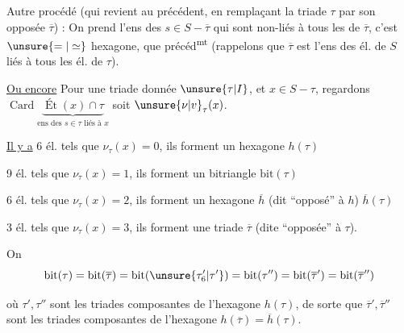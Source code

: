Autre procédé (qui revient au précédent, en remplaçant la triade $\tau$ par son opposée $\overline\tau$) : On prend l'ens des $s\in S-\overline\tau$ qui sont non-liés à tous les  de $\overline\tau$,  c'est   $\unsure{=|\simeq}$ hexagone,  que précéd\textsuperscript{mt} (rappelons que $\overline\tau$ est l'ens des él. de $S$ liés à tous les él. de $\tau$).

\uline{Ou encore} Pour une triade donnée $\unsure{\tau|I}$, et $x\in S-\tau$, regardons  $\operatorname{Card}\underbrace{\operatorname{Ét}(x)\cap\tau}_{\text{ens des }s\in\tau\text{ liés à }x}$ \unsure{,|]} soit $\unsure{\nu|v}_\tau(x)$.

\uline{Il y a} 6 él. tels que $\nu_\tau(x)=0$, ils forment un hexagone $h(\tau)$

9 él. tels que $\nu_\tau(x)=1$, ils forment un bitriangle $\mathrm{bit}(\tau)$

6 él. tels que $\nu_\tau(x)=2$, ils forment un hexagone $\overline h$ (dit ``opposé'' à $h$) $\overline h(\tau)$

3 él. tels que $\nu_\tau(x)=3$, ils forment une triade $\overline\tau$ (dite ``opposée'' à $\tau$).


On 
\[
\mathrm{bit}(\tau)=\mathrm{bit}(\overline\tau)=\mathrm{bit}(\unsure{\tau'_6|\tau'})=\mathrm{bit}(\tau'')=\mathrm{bit}(\overline\tau')=\mathrm{bit}(\overline\tau'')
\]

où $\tau',\tau''$ sont les triades composantes de l'hexagone $h(\tau)$, de sorte que $\overline\tau',\overline\tau''$ sont les triades composantes de l'hexagone $h(\overline\tau)=\overline h(\tau)$.




